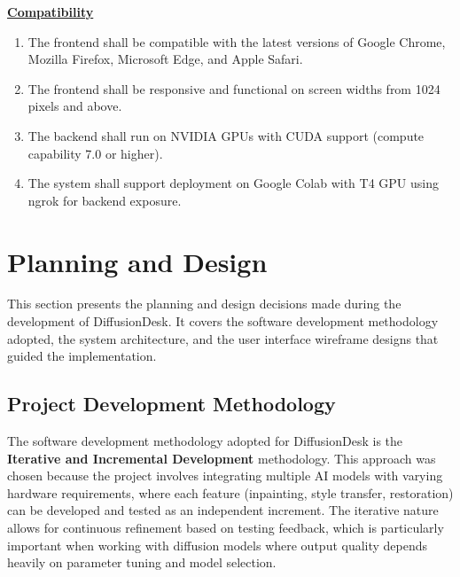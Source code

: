 \documentclass[12pt,a4paper]{report}
\begin{document}
\vspace{0.5em}
\noindent\underline{\textbf{Compatibility}}

\begin{enumerate}[label=\textbf{NFR-\arabic*}.,start=20]
    \item The frontend shall be compatible with the latest versions of Google Chrome, Mozilla Firefox, Microsoft Edge, and Apple Safari.
    \item The frontend shall be responsive and functional on screen widths from 1024 pixels and above.
    \item The backend shall run on NVIDIA GPUs with CUDA support (compute capability 7.0 or higher).
    \item The system shall support deployment on Google Colab with T4 GPU using ngrok for backend exposure.
\end{enumerate}

\newpage

\section{Planning and Design}

This section presents the planning and design decisions made during the development of DiffusionDesk. It covers the software development methodology adopted, the system architecture, and the user interface wireframe designs that guided the implementation.

\subsection{Project Development Methodology}

The software development methodology adopted for DiffusionDesk is the \textbf{Iterative and Incremental Development} methodology. This approach was chosen because the project involves integrating multiple AI models with varying hardware requirements, where each feature (inpainting, style transfer, restoration) can be developed and tested as an independent increment. The iterative nature allows for continuous refinement based on testing feedback, which is particularly important when working with diffusion models where output quality depends heavily on parameter tuning and model selection.

\end{document}

